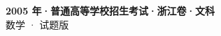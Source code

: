 \documentclass[zihao=-4, a4paper]{ctexart}
\begin{document}
\begin{center}
  {\Large\bfseries 2005 年·普通高等学校招生考试·浙江卷·文科}\\[4pt]
  {\large 数学 · 试题版}
\end{center}
\medskip
{}

\end{document}
